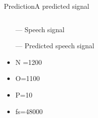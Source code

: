 \begin{frame}{Prediction}{A predicted signal}
	\begin{columns}
		\begin{column}{0.4\textwidth}
			\begin{itemize}
				\item[\textcolor{MATLABblue}{---}] Speech signal
				\item[\textcolor{MATLABorange}{---}] Predicted speech signal
				\item N =1200
				\item O=1100
				\item P=10
				\item fs=48000
			\end{itemize}
			
		\end{column}
		\begin{column}{0.6\textwidth} 
			\resizebox{1.0\columnwidth}{!}{	
				
			}
		\end{column}
	\end{columns}
\end{frame}























